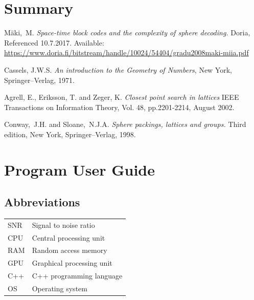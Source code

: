 \documentclass[english,12pt,a4paper,pdftex,sci,utf8]{aaltothesis}
\begin{document}
\clearpage

\section{Summary}


\clearpage

{}
\begin{thebibliography}{99}

 Mäki,\ M. \textit{Space-time block codes and the complexity of sphere decoding.} Doria, Referenced 10.7.2017. Available:
  \url{https://www.doria.fi/bitstream/handle/10024/54404/gradu2008maki-miia.pdf}
  
  
 Cassels, J.W.S. \textit{An introduction to the Geometry of Numbers}, New York, Springer--Verlag, 1971.

 Agrell, E., Eriksson, T. and Zeger, K. \textit{Closest point search in lattices} IEEE Transactions on Information Theory, Vol. 48, pp.2201-2214,
August 2002.

 Conway,\ J.H. and Sloane,\ N.J.A. \textit{Sphere packings, lattices and groups.} Third edition, New York, Springer--Verlag, 1998.


\end{thebibliography}

\clearpage

\thesisappendix

\section{Program User Guide}

\subsection{Abbreviations}
\begin{tabular}{ll}
SNR & Signal to noise ratio \\
CPU & Central processing unit \\
RAM & Random access memory \\
GPU & Graphical processing unit \\
C++ & C++ programming language \\
OS & Operating system \\
\end{tabular}
\end{document}
